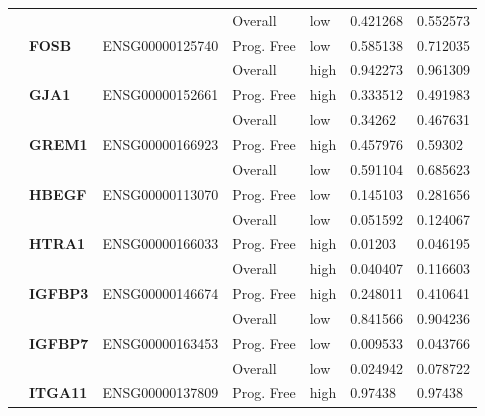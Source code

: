 \begin{spacing}{1}
{\begin{longtable}{%
            |>{\bfseries}p{2cm}|
            >{\bfseries}p{1.9cm}|
            >{\tiny}p{1.9cm}|
            p{2cm}|
            p{2cm}|
            p{1.5cm}|
            p{1.5cm}|
            }
            \hhline{~~~----}
             &          &                 & Overall    & low  & 0.421268 & 0.552573 \\
            \hhline{~======}
             & FOSB     & ENSG00000125740 & Prog. Free & low  & 0.585138 & 0.712035 \\
            \hhline{~~~----}
             &          &                 & Overall    & high & 0.942273 & 0.961309 \\
            \hhline{~======}
            \multirow{2}{3cm}{False}
             & GJA1     & ENSG00000152661 & Prog. Free & high & 0.333512 & 0.491983 \\
            \hhline{~~~----}
             &          &                 & Overall    & low  & 0.34262  & 0.467631 \\
            \hhline{~======}
             & GREM1    & ENSG00000166923 & Prog. Free & high & 0.457976 & 0.59302  \\
            \hhline{~~~----}
             &          &                 & Overall    & low  & 0.591104 & 0.685623 \\
            \hhline{~======}
             & HBEGF    & ENSG00000113070 & Prog. Free & low  & 0.145103 & 0.281656 \\
            \hhline{~~~----}
             &          &                 & Overall    & low  & 0.051592 & 0.124067 \\
            \hhline{~======}
             & HTRA1    & ENSG00000166033 & Prog. Free & high & 0.01203  & 0.046195 \\
            \hhline{~~~----}
             &          &                 & Overall    & high & 0.040407 & 0.116603 \\
            \hhline{~======}
             & IGFBP3   & ENSG00000146674 & Prog. Free & high & 0.248011 & 0.410641 \\
            \hhline{~~~----}
             &          &                 & Overall    & low  & 0.841566 & 0.904236 \\
            \hhline{~======}
             & IGFBP7   & ENSG00000163453 & Prog. Free & low  & 0.009533 & 0.043766 \\
            \hhline{~~~----}
             &          &                 & Overall    & low  & 0.024942 & 0.078722 \\
            \hhline{~======}
             & ITGA11   & ENSG00000137809 & Prog. Free & high & 0.97438  & 0.97438  \\

\end{longtable}}
\end{spacing}
